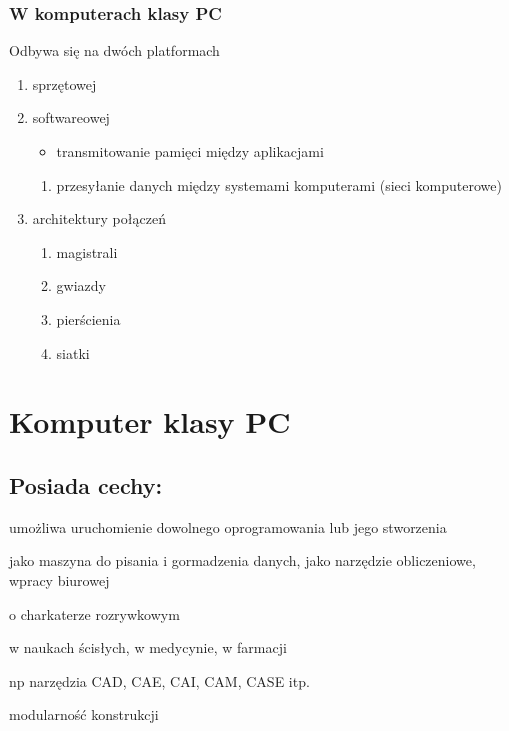 \documentclass[11pt]{article}
\begin{document}
\subsubsection{W komputerach klasy PC}
\label{sec:org2d7f502}
Odbywa się na dwóch platformach
\begin{enumerate}
\item sprzętowej
\label{sec:org97411e0}
\item softwareowej
\label{sec:org7a470b0}
\begin{itemize}
\item transmitowanie pamięci między aplikacjami
\end{itemize}
\begin{enumerate}
\item przesyłanie danych między systemami komputerami (sieci komputerowe)
\label{sec:org7dc5912}
\end{enumerate}
\item architektury połączeń
\label{sec:org29dcb58}
\begin{enumerate}
\item magistrali
\label{sec:orgefe5a31}
\item gwiazdy
\label{sec:orgd9043b3}
\item pierścienia
\label{sec:org26e2da4}
\item siatki
\label{sec:org4df6d58}
\end{enumerate}
\end{enumerate}
\section{Komputer klasy PC}
\label{sec:orgc141537}
\subsection{Posiada cechy:}
\label{sec:orgbcd6280}
\begin{description}
\item[{porgramowalność}] umożliwa uruchomienie dowolnego oprogramowania lub jego stworzenia
\item[{uniwersalne zastosowania}] \begin{description}
\item[{typowo użytkowe}] jako maszyna do pisania i gormadzenia danych, jako narzędzie obliczeniowe, wpracy biurowej
\item o charkaterze rozrywkowym
\item[{badawczo-naukowe}] w naukach ścisłych, w medycynie, w farmacji
\item[{wspomagające projektowanie}] np narzędzia CAD, CAE, CAI, CAM, CASE itp.
\end{description}
\item modularność konstrukcji
\end{description}
\end{document}
